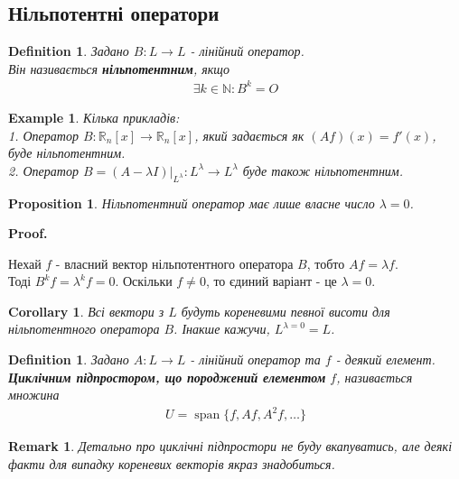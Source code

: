 \documentclass[a4paper, 10pt]{article}
\makeatletter
\theoremstyle{theoremdd}
\newtheorem{definition}[theorem]{Definition}
\newtheorem{example}[theorem]{Example}
\newtheorem{proposition}[theorem]{Proposition}
\newtheorem{remark}[theorem]{Remark}
\newtheorem{corollary}[theorem]{Corollary}
\DeclareMathOperator{\linspan}{span}
\renewenvironment{proof}[1][Proof.\\]{\par
\pushQED{\hfill \qed}%
\normalfont \topsep6\p@\@plus6\p@\relax
\trivlist
\item\relax
{\bfseries
#1\@addpunct{.}}\hspace\labelsep\ignorespaces
}{%
\popQED\endtrivlist\@endpefalse
}
\makeatother
\begin{document}
\subsection{Нільпотентні оператори}
\begin{definition}
Задано $B \colon L \to L$ - лінійний оператор.\\
Він називається \textbf{нільпотентним}, якщо
\begin{align*}
\exists k \in \mathbb{N}: B^k = O
\end{align*}
\end{definition}

\begin{example}
Кілька прикладів:\\
1. Оператор $B \colon \mathbb{R}_n[x] \to \mathbb{R}_n[x]$, який задається як $(Af)(x) = f'(x)$, буде нільпотентним.\\
2. Оператор $B = (A-\lambda I)|_{L^\lambda} \colon L^{\lambda} \to L^{\lambda}$ буде також нільпотентним.
\end{example}

\begin{proposition}
Нільпотентний оператор має лише власне число $\lambda = 0$.
\end{proposition}

\begin{proof}
Нехай $f$ - власний вектор нільпотентного оператора $B$, тобто $Af = \lambda f$.\\
Тоді $B^k f = \lambda^k f = 0$. Оскільки $f \neq 0$, то єдиний варіант - це $\lambda = 0$.
\end{proof}

\begin{corollary}
Всі вектори з $L$ будуть кореневими певної висоти для нільпотентного оператора $B$. Інакше кажучи, $L^{\lambda =  0} = L$.
\end{corollary}

\begin{definition}
Задано $A \colon L \to L$ - лінійний оператор та $f$ - деякий елемент.\\
\textbf{Циклічним підпростором, що породжений елементом} $f$, називається множина
\begin{align*}
U = \linspan\{f,Af,A^2f,\dots\}
\end{align*}
\end{definition}

\begin{remark}
Детально про циклічні підпростори не буду вкапуватись, але деякі факти для випадку кореневих векторів якраз знадобиться.
\end{remark}
\end{document}
